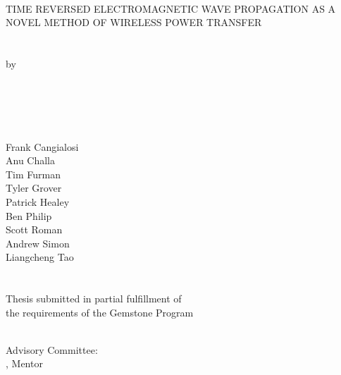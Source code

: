 \hbox{\ }
\vspace{0.5in}
\startSINGLEspacing
\begin{center}

\large{{TIME REVERSED ELECTROMAGNETIC WAVE PROPAGATION AS A \\
NOVEL METHOD OF WIRELESS POWER TRANSFER}}\\
\ \\
\ \\
\large{by} \\
\ \\
\large{\teamname}
\ \\
\ \\
\ \\
\ \\
\small\normalsize
Frank Cangialosi\\
Anu Challa\\
Tim Furman\\
Tyler Grover\\
Patrick Healey\\
Ben Philip\\
Scott Roman\\
Andrew Simon\\
Liangcheng Tao\\
\ \\ 
\ \\
Thesis submitted in partial fulfillment of \\ 
the requirements of the Gemstone Program\\
\Umd \\
\the\year
\end{center}

\vspace{7.5em}

\noindent Advisory Committee: \\
\mentor, Mentor
\discussantsEACHLINE
